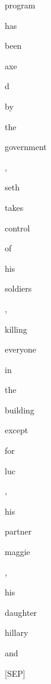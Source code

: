 \documentclass[varwidth=150mm]{standalone}
\begin{document}
\begin{CJK*}{UTF8}{gbsn}
{{{\colorbox{red!4.410977840423584}{\strut program} \colorbox{red!0.0}{\strut has} \colorbox{red!0.0}{\strut been} \colorbox{red!0.0}{\strut axe}\colorbox{red!0.0}{\strut d} \colorbox{red!0.0}{\strut by} \colorbox{red!0.0}{\strut the} \colorbox{red!3.8132615089416504}{\strut government} \colorbox{red!0.0}{\strut ,} \colorbox{red!3.060153007507324}{\strut seth} \colorbox{red!0.0}{\strut takes} \colorbox{red!0.0}{\strut control} \colorbox{red!1.3540688753128052}{\strut of} \colorbox{red!0.0}{\strut his} \colorbox{red!2.206904411315918}{\strut soldiers} \colorbox{red!0.0}{\strut ,} \colorbox{red!2.123169422149658}{\strut killing} \colorbox{red!0.0}{\strut everyone} \colorbox{red!0.0}{\strut in} \colorbox{red!5.728235244750977}{\strut the} \colorbox{red!26.591989517211914}{\strut building} \colorbox{red!7.0708489418029785}{\strut except} \colorbox{red!0.0}{\strut for} \colorbox{red!5.697238445281982}{\strut luc} \colorbox{red!4.079453468322754}{\strut ,} \colorbox{red!0.0}{\strut his} \colorbox{red!0.0}{\strut partner} \colorbox{red!26.30773162841797}{\strut maggie} \colorbox{red!6.244521617889404}{\strut ,} \colorbox{red!0.0}{\strut his} \colorbox{red!1.5998677015304565}{\strut daughter} \colorbox{red!9.669682502746582}{\strut hillary} \colorbox{red!16.510969161987305}{\strut and} \colorbox{red!8.76036262512207}{\strut [SEP]}
}}}
\end{CJK*}
\end{document}
